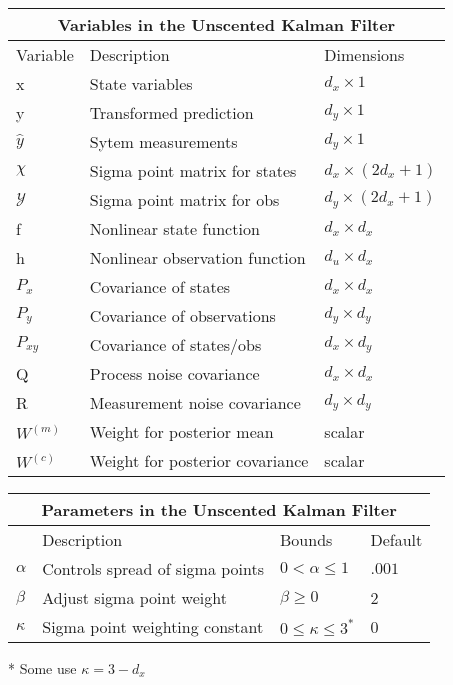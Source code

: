 \begin{enumerate}
\newpage            
\centering
\begin{center}
\begin{tabular}{ |p{2cm}||p{5cm}|p{2cm}| }
    \hline
    \multicolumn{3}{|c|}{Variables in the Unscented Kalman Filter } \\ 
    \hline
    Variable & Description & Dimensions \\
    \hline
    x & State variables & $d_x \times 1 $\\ 
    y & Transformed prediction & $d_y \times 1 $\\ 
    $\hat y$ & Sytem measurements & $d_y \times 1 $\\ 
    $\chi $ & Sigma point matrix for states&$ d_x \times (2 d_x + 1) $\\
    $\mathcal{Y}$ & Sigma point matrix for obs &$ d_y \times (2 d_x + 1) $\\
    f & Nonlinear state function & $d_x \times d_x $  \\ 
    h & Nonlinear observation function & $d_u \times d_x$\\
    $P_x$ & Covariance of states & $d_x \times d_x $  \\
    $P_y$ & Covariance of observations& $d_y \times d_y $  \\
    $P_{xy}$ & Covariance of states/obs& $d_x \times d_y $  \\
    Q & Process noise covariance & $d_x \times d_x $  \\
    R & Measurement noise covariance & $d_y \times d_y $  \\
     $W^{(m)}$ & Weight for posterior mean & scalar \\
    $W^{(c)}$ & Weight for posterior covariance & scalar \\
    \hline
\end{tabular} 
\end{center}

\begin{center}
\begin{tabular}{ |p{1cm}||p{5cm}|p{2cm}| p{1cm}| }
    \hline
    \multicolumn{4}{|c|}{Parameters in the Unscented Kalman Filter } \\ 
    \hline
     & Description & Bounds & Default \\
    \hline
    $\alpha$ & Controls spread of sigma points & $0 < \alpha \leq 1$ & $.001$\\
    $\beta$ & Adjust sigma point weight & $\beta \geq 0$ & 2\\
    $\kappa $ & Sigma point weighting constant & $0 \leq \kappa \leq 3^{*}$  & 0 \\
    \hline
\end{tabular}
\end{center}
* Some use $\kappa  = 3 - d_x$             
            
            
            
            
            
            
            
    
    
        
\end{enumerate}